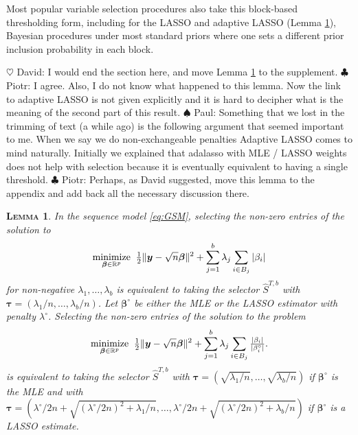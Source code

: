 \documentclass[aos]{imsart}
\theoremstyle{plain}
\newtheorem{lem}{\textsc{Lemma}}[section]
\newcommand{\david}[1]{{\small{\color{blue} \sf $\heartsuit$ David: #1}}}
\newcommand{\piotr}[1]{{\small{\color{red} \sf $\clubsuit$ Piotr: #1}}}
\newcommand{\paul}[1]{{\small{\color{green} \sf $\spadesuit$ Paul: #1}}}
\newcommand{\R}{\mathbb{R}}
\newcommand{\bs}{\boldsymbol}
\begin{document}
Most popular variable selection procedures also take this block-based thresholding form, including for the LASSO and adaptive LASSO (Lemma \ref{lem:l1isthreshold}), Bayesian procedures under most standard priors \citep{davidomiros} where one sets a different prior inclusion probability in each block.

\david{I would end the section here, and move Lemma \ref{lem:l1isthreshold} to the supplement.}\piotr{I agree. Also, I do not know what happened to this lemma. Now the link to adaptive LASSO is not given explicitly and it is hard to decipher what is the meaning of the second part of this result.} \paul{Something that we lost in the trimming of text (a while ago) is the following argument that seemed important to me. When we say we do non-exchangeable penalties Adaptive LASSO comes to mind naturally. Initially we explained that adalasso with MLE / LASSO weights does not help with selection because it is eventually equivalent to having a single threshold.}\piotr{Perhaps, as David suggested, move this lemma to the appendix and add back all the necessary discussion there. }

\begin{lem}\label{lem:l1isthreshold}
	In the sequence model \eqref{eq:GSM}, selecting the non-zero entries  of the solution to 
\begin{equation}\label{eq:genl1}
	\underset{\bs \beta \in \R^p}{\rm minimize} \;\;\tfrac12\|\bs y-\sqrt{n}\bs\beta\|^2+\sum_{j=1}^b \lambda_j \sum_{i \in B_j}|\beta_{i}|
\end{equation}
for non-negative %
$\lambda_1,\ldots,\lambda_b$  is equivalent to taking the selector $\hat S^{T,b}$ with $\bs \tau=(\lambda_1/n,\ldots,\lambda_b/n)$. Let $\bs\beta^\circ$ be either the MLE or the LASSO estimator with penalty $\lambda^\circ$. Selecting the non-zero entries  of the solution to the problem
\begin{equation}\label{eq:genl1ada}
	\underset{\bs \beta \in \R^p}{\rm minimize} \;\;\tfrac12\|\bs y-\sqrt{n}\bs\beta\|^2+\sum_{j=1}^b \lambda_j \sum_{i \in B_j}\tfrac{|\beta_{i}|}{|\beta_i^\circ|}.
\end{equation}
is equivalent to taking the selector $\hat S^{T,b}$ with $\bs \tau=(\sqrt{\lambda_1/n},\ldots,\sqrt{\lambda_b/n})$ if $\bs\beta^\circ$ is the MLE and with $\bs \tau=(\lambda^\circ/2n+\sqrt{(\lambda^\circ/2n)^2+\lambda_1/n},\ldots,\lambda^\circ/2n+\sqrt{(\lambda^\circ/2n)^2+\lambda_b/n})$ if $\bs\beta^\circ$ is a LASSO estimate.
\end{lem}
\end{document}
